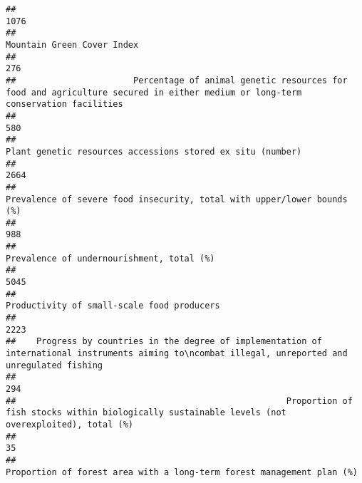 \documentclass[]{article}
\begin{document}
\begin{verbatim}
##                                                                                                                                                1076 
##                                                                                                                          Mountain Green Cover Index 
##                                                                                                                                                 276 
##                       Percentage of animal genetic resources for food and agriculture secured in either medium or long-term conservation facilities 
##                                                                                                                                                 580 
##                                                                                          Plant genetic resources accessions stored ex situ (number) 
##                                                                                                                                                2664 
##                                                                             Prevalence of severe food insecurity, total with upper/lower bounds (%) 
##                                                                                                                                                 988 
##                                                                                                           Prevalence of undernourishment, total (%) 
##                                                                                                                                                5045 
##                                                                                                          Productivity of small-scale food producers 
##                                                                                                                                                2223 
##    Progress by countries in the degree of implementation of international instruments aiming to\ncombat illegal, unreported and unregulated fishing 
##                                                                                                                                                 294 
##                                                     Proportion of fish stocks within biologically sustainable levels (not overexploited), total (%) 
##                                                                                                                                                  35 
##                                                                               Proportion of forest area with a long-term forest management plan (%) 

\end{verbatim}
\end{document}
